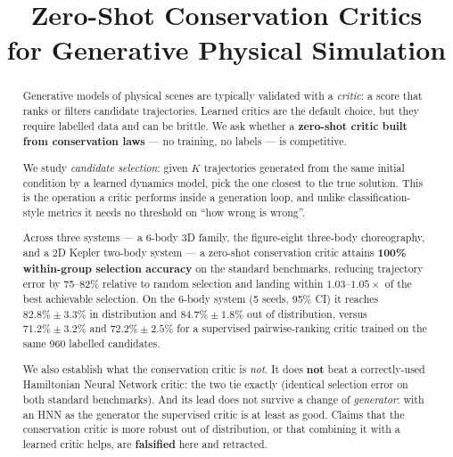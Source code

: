 \documentclass[11pt]{article}
\title{Zero-Shot Conservation Critics\\ for Generative Physical Simulation}
\author{}
\date{}
\begin{document}
\maketitle

\begin{abstract}
Generative models of physical scenes are typically validated with a \emph{critic}: a
score that ranks or filters candidate trajectories. Learned critics are the default
choice, but they require labelled data and can be brittle. We ask whether a
\textbf{zero-shot critic built from conservation laws} --- no training, no labels ---
is competitive.

We study \emph{candidate selection}: given $K$ trajectories generated from the same
initial condition by a learned dynamics model, pick the one closest to the true
solution. This is the operation a critic performs inside a generation loop, and unlike
classification-style metrics it needs no threshold on ``how wrong is wrong''.

Across three systems --- a 6-body 3D family, the figure-eight three-body choreography,
and a 2D Kepler two-body system --- a zero-shot conservation critic attains
\textbf{100\% within-group selection accuracy} on the standard benchmarks, reducing
trajectory error by 75--82\% relative to random selection and landing within
$1.03$--$1.05\times$ of the best achievable selection. On the 6-body system (5 seeds,
95\% CI) it reaches $82.8\%\pm3.3\%$ in distribution and $84.7\%\pm1.8\%$ out of
distribution, versus $71.2\%\pm3.2\%$ and $72.2\%\pm2.5\%$ for a supervised
pairwise-ranking critic trained on the same 960 labelled candidates.

We also establish what the conservation critic is \emph{not}. It does \textbf{not} beat
a correctly-used Hamiltonian Neural Network critic: the two tie exactly (identical
selection error on both standard benchmarks). And its lead does not survive a change of
\emph{generator}: with an HNN as the generator the supervised critic is at least as good.
Claims that the conservation critic is more robust out of distribution, or that combining
it with a learned critic helps, are \textbf{falsified} here and retracted.


\end{abstract}
\end{document}
